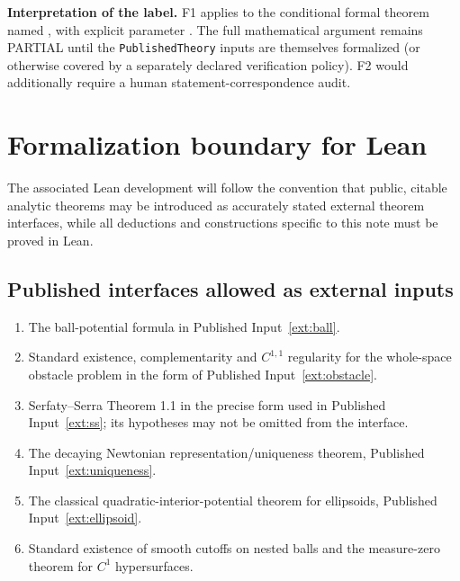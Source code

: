 \documentclass[11pt]{article}
\theoremstyle{definition}
\theoremstyle{remark}
\newcommand{\1}{\mathbf{1}}
\begin{document}
\noindent\textbf{Interpretation of the label.} F1 applies to the conditional formal theorem named \texttt{}, with explicit parameter \texttt{}. The full mathematical argument remains PARTIAL until the \texttt{PublishedTheory} inputs are themselves formalized (or otherwise covered by a separately declared verification policy). F2 would additionally require a human statement-correspondence audit.
\endgroup

\section{Formalization boundary for Lean}

The associated Lean development will follow the convention that public, citable analytic theorems may be introduced as accurately stated external theorem interfaces, while all deductions and constructions specific to this note must be proved in Lean.

\subsection*{Published interfaces allowed as external inputs}
\begin{enumerate}[label=\textbf{E129.\arabic*.}]
\item The ball-potential formula in Published Input~\ref{ext:ball}.
\item Standard existence, complementarity and $C^{1,1}$ regularity for the whole-space obstacle problem in the form of Published Input~\ref{ext:obstacle}.
\item Serfaty--Serra Theorem 1.1 in the precise form used in Published Input~\ref{ext:ss}; its hypotheses may not be omitted from the interface.
\item The decaying Newtonian representation/uniqueness theorem, Published Input~\ref{ext:uniqueness}.
\item The classical quadratic-interior-potential theorem for ellipsoids, Published Input~\ref{ext:ellipsoid}.
\item Standard existence of smooth cutoffs on nested balls and the measure-zero theorem for $C^1$ hypersurfaces.
\end{enumerate}
\end{document}
